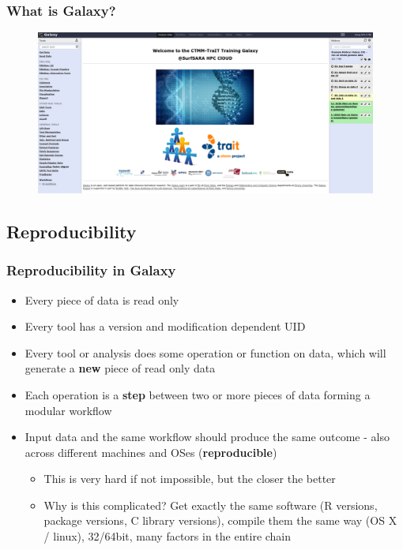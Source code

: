 \documentclass{beamer}              %
\begin{document}
\begin{frame}
    \frametitle{What is Galaxy?}
	\begin{figure}
		\includegraphics[width=\textwidth]{figures/101p_02.png}
	\end{figure}
\end{frame}

\subsection{Reproducibility}
\begin{frame}
    \frametitle{Reproducibility in Galaxy}
    \begin{itemize}
	    \item Every piece of data is read only
	    \item Every tool has a version and modification dependent UID
	    \item Every tool or analysis does some operation or function on data, which will generate a \textbf{new} piece of read only data
	    \item Each operation is a \textbf{step} between two or more pieces of data forming a modular workflow
	    \item Input data and the same workflow should produce the same outcome - also across different machines and OSes (\textbf{reproducible})
    	\begin{itemize}
	    	\item This is very hard if not impossible, but the closer the better
	    	\item Why is this complicated? Get exactly the same software (R versions, package versions, C library versions), compile them the same way (OS X / linux), 32/64bit, many factors in the entire chain
    	\end{itemize}
    \end{itemize}
\end{frame}
\end{document}
